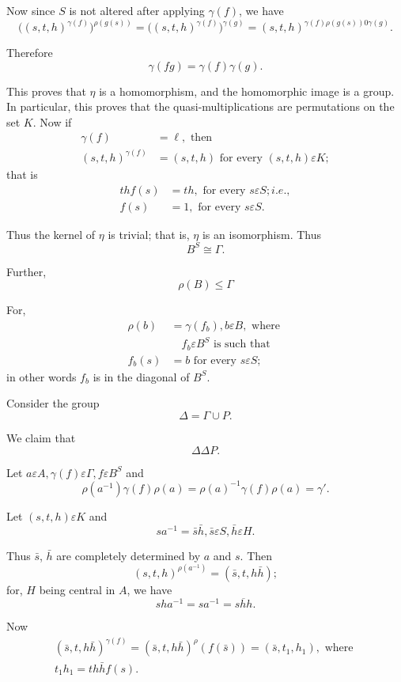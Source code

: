 Now since $S$ is not altered after applying $\gamma(f)$, we have
$$
\bigg ( (s,t,h)^{\gamma(f)} \bigg) ^{\rho(g(s))}=\bigg (
(s,t,h)^{\gamma(f)} \bigg) ^{\gamma(g)}= (s,t,h)^{\gamma(f)\rho(g(s))0
  \gamma(g)}. 
$$

Therefore
$$
\gamma(fg)=\gamma(f) \gamma(g).
$$

This proves that $\eta$ is a homomorphism, and the homomorphic image
is a group. In particular, this proves that the quasi-multiplications
are permutations on the set $K$. Now if 
\begin{align*}
  \gamma(f) &= \ell, \text{ then }\\
  (s,t,h)^{\gamma(f)} &=(s,t,h) \text{ for every } (s,t,h) \varepsilon K;
\end{align*}
that is 
\begin{align*}
  thf(s)& = th, \text{ for every } s \varepsilon S; i.e.,\\
  f(s)& = 1, \text{ for every } s \varepsilon S.
\end{align*}

Thus the kernel of $\eta$ is trivial; that is, $\eta$ is an
isomorphism. Thus 
$$
B^S \cong \Gamma.
$$

Further,
$$
\rho (B)\leq \Gamma
$$

For,
\begin{align*}
  \rho (b)& =\gamma(f_b), b \varepsilon B, \text{ where }\\
  &\quad f_b \varepsilon B^S \text{ is such that}\\
  f_b(s)& = b \text{ for every }s \varepsilon S;
\end{align*}
in other words $f_b$ is in the diagonal of $B^S$.

Consider the group
$$
\Delta =\Gamma \cup P.
$$

We claim that
$$
\Delta \Delta P.
$$

Let $a \varepsilon A, \gamma (f) \varepsilon \Gamma, f \varepsilon
B^S$  and  
$$
\rho (a^{-1}) \gamma (f) \rho (a) = \rho (a)^{-1} \gamma (f) \rho (a)
= \gamma'. 
$$

Let $(s,t,h) \varepsilon K$ and 
$$
sa^{-1}= \bar{s} \bar{h}, \bar{s} \varepsilon S, \bar{h} \varepsilon
H. 
$$

Thus $\bar{s}$, $\bar{h}$ are completely determined by $a$ and
$s$. Then  
$$
(s, t, h)^{\rho(a^{-1})} =(\bar{s}, t, h \bar{h});
$$
for, $H$ being central in $A$, we have 
$$
sha^{-1} = sa^{-1} = \overline{shh}.
$$

Now 
\begin{gather*}
  (\bar{s}, t, h\bar{h})^{\gamma (f)}= (\bar{s},t,h\bar{h})^\rho
  (f(\bar{s})) = (\bar{s}, t_1, h_1), \text{ where } \\ 
  t_1 h_1 = th \bar{h}f(s). 
\end{gather*}


